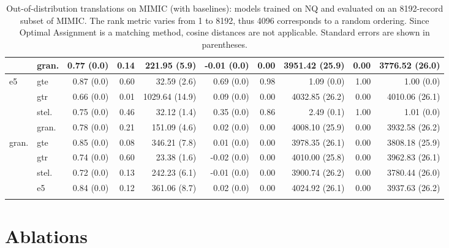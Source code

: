 \begin{table}[!ht]
\begin{tabular}{llrrrrrrrr}
        & gran. & 0.77 {\tiny (0.0)} & 0.14 & 221.95 {\tiny (5.9)} & -0.01 {\tiny (0.0)} & 0.00 & 3951.42 {\tiny (25.9)} & 0.00 & 3776.52 {\tiny (26.0)} \\
        \midrule
        \multirow{4}{*}{e5} & gte & 0.87 {\tiny (0.0)} & 0.60 & 32.59 {\tiny (2.6)} & 0.69 {\tiny (0.0)} & 0.98 & 1.09 {\tiny (0.0)} & 1.00 & 1.00 {\tiny (0.0)} \\
        & gtr & 0.66 {\tiny (0.0)} & 0.01 & 1029.64 {\tiny (14.9)} & 0.09 {\tiny (0.0)} & 0.00 & 4032.85 {\tiny (26.2)} & 0.00 & 4010.06 {\tiny (26.1)} \\
        & stel. & 0.75 {\tiny (0.0)} & 0.46 & 32.12 {\tiny (1.4)} & 0.35 {\tiny (0.0)} & 0.86 & 2.49 {\tiny (0.1)} & 1.00 & 1.01 {\tiny (0.0)} \\
        & gran. & 0.78 {\tiny (0.0)} & 0.21 & 151.09 {\tiny (4.6)} & 0.02 {\tiny (0.0)} & 0.00 & 4008.10 {\tiny (25.9)} & 0.00 & 3932.58 {\tiny (26.2)} \\
        \midrule
        \multirow{4}{*}{gran.} & gte & 0.85 {\tiny (0.0)} & 0.08 & 346.21 {\tiny (7.8)} & 0.01 {\tiny (0.0)} & 0.00 & 3978.35 {\tiny (26.1)} & 0.00 & 3808.18 {\tiny (25.9)} \\
        & gtr & 0.74 {\tiny (0.0)} & 0.60 & 23.38 {\tiny (1.6)} & -0.02 {\tiny (0.0)} & 0.00 & 4010.00 {\tiny (25.8)} & 0.00 & 3962.83 {\tiny (26.1)} \\
        & stel. & 0.72 {\tiny (0.0)} & 0.13 & 242.23 {\tiny (6.1)} & -0.01 {\tiny (0.0)} & 0.00 & 3900.74 {\tiny (26.2)} & 0.00 & 3780.44 {\tiny (26.0)} \\
        & e5 & 0.84 {\tiny (0.0)} & 0.12 & 361.06 {\tiny (8.7)} & 0.02 {\tiny (0.0)} & 0.00 & 4024.92 {\tiny (26.1)} & 0.00 & 3937.63 {\tiny (26.2)} \\
        \bottomrule\\[-1.6ex]
    \end{tabular}
    \caption{Out-of-distribution translations on MIMIC (with baselines): \atk{} models trained on NQ and evaluated on an 8192-record subset of MIMIC. The rank metric varies from 1 to 8192, thus 4096 corresponds to a random ordering. Since Optimal Assignment is a matching method, cosine distances are not applicable.  Standard errors are shown in parentheses.}
    \label{tab:embedding_comparison_ood_mimic}
\end{table}

\newpage

\section{Ablations}
\label{sec:ablations}

